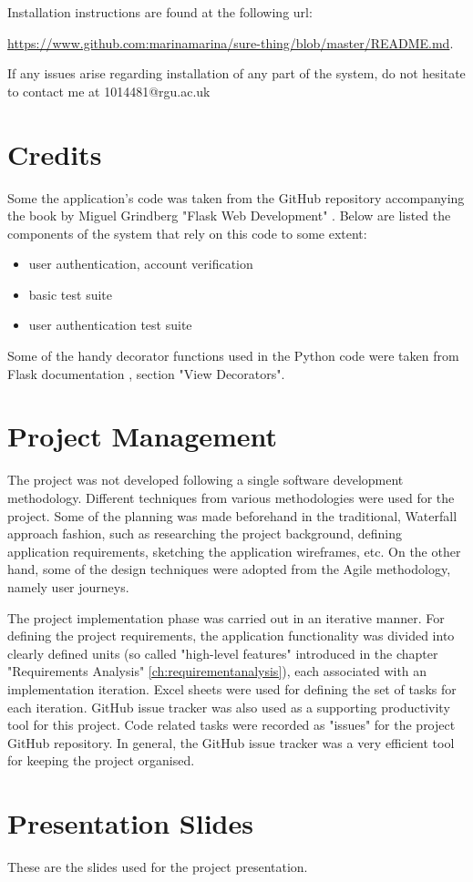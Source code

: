 Installation instructions are found at the following url:

\url{https://www.github.com:marinamarina/sure-thing/blob/master/README.md}.


If any issues arise regarding installation of any part of the system, do not hesitate to contact me at 1014481@rgu.ac.uk

\chapter{Credits}
\label{ch:credits_appendix}
Some the application's code was taken from the GitHub repository accompanying the book by Miguel Grindberg "Flask Web Development" \citep{book:Grindberg2014FlaskWebDevelopment}. Below are listed the components of the system that rely on this code to some extent:

\begin{itemize}
	\item user authentication, account verification
	\item basic test suite
	\item user authentication test suite
\end{itemize}

Some of the handy decorator functions used in the Python code were taken from Flask documentation \citep{documentation:Flask}, section "View Decorators".

\chapter{Project Management}
\label{ch:pm_appendix}
The project was not developed following a single software development methodology. Different techniques from various methodologies were used for the project. Some of the planning was made beforehand in the traditional, Waterfall approach fashion, such as researching the project background, defining application requirements, sketching the application wireframes, etc. On the other hand, some of the design techniques were adopted from the Agile methodology, namely user journeys. 

The project implementation phase was carried out in an iterative manner. For defining the project requirements, the application functionality was divided into clearly defined units (so called "high-level features" introduced in the chapter "Requirements Analysis" \ref{ch:requirementanalysis}), each associated with an implementation iteration. Excel sheets were used for defining the set of tasks for each iteration. GitHub issue tracker was also used as a supporting productivity tool for this project. Code related tasks were recorded as "issues" for the project GitHub repository. In general, the GitHub issue tracker was a very efficient tool for keeping the project organised. 

\chapter{Presentation Slides}
\label{ch:slides_appendix}
These are the slides used for the project presentation.




